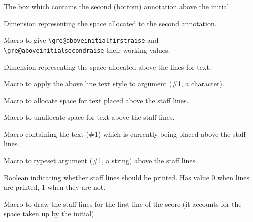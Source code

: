 The box which contains the second (bottom) annotation above the initial.

Dimension representing the space allocated to the second annotation.

Macro to give \verb=\gre@aboveinitialfirstraise= and\\
\verb=\gre@aboveinitialsecondraise= their working values.
	
Dimension representing the space allocated above the lines for text.	

Macro to apply the above line text style to argument (\#1, a character).

Macro to allocate space for text placed above the staff lines.

Macro to unallocate space for text above the staff lines.

Macro containing the text (\#1) which is currently being placed above
the staff lines.

Macro to typeset argument (\#1, a string) above the staff lines.

Boolean indicating whether staff lines should be printed.  Has value 0
when lines are printed, 1 when they are not.

Macro to draw the staff lines for the first line of the score (\ie it
accounts for the space taken up by the initial).

